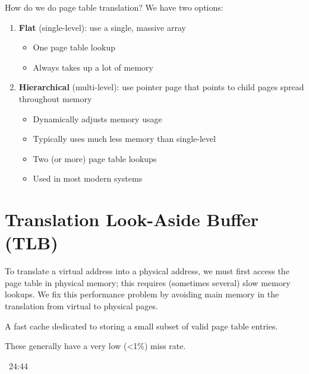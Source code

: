 How do we do page table translation? We have two options:
\begin{enumerate}
  \item \textbf{Flat} (single-level): use a single, massive array
  \begin{itemize}
    \item One page table lookup
    \item Always takes up a lot of memory
  \end{itemize}
  \item \textbf{Hierarchical} (multi-level): use pointer page that points to child pages spread throughout memory
  \begin{itemize}
    \item Dynamically adjusts memory usage
    \item Typically uses much less memory than single-level
    \item Two (or more) page table lookups
    \item Used in most modern systems
  \end{itemize}
\end{enumerate}

\section{Translation Look-Aside Buffer (TLB)}
To translate a virtual address into a physical address, we must first access the page table in physical memory; this requires (sometimes several) slow memory lookups. We fix this performance problem by avoiding main memory in the translation from virtual to physical pages.

\begin{definition}
  A fast cache dedicated to storing a small subset of valid page table entries.
  \begin{remark}
    These generally have a very low (<1\%) miss rate.
  \end{remark}
\end{definition}
~24:44